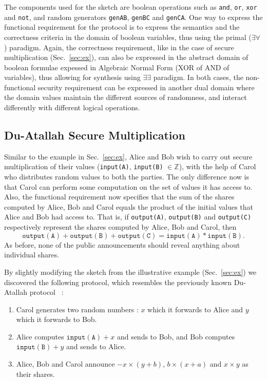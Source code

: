 \documentclass[preprint]{sig-alternate-05-2015}
\begin{document}
The components used for the sketch are boolean operations such as \texttt{and},
\texttt{or}, \texttt{xor} and \texttt{not}, and random generators \texttt{genAB},
\texttt{genBC} and \texttt{genCA}.
One way to express the functional requirement for the protocol is to 
express the semantics and the correctness criteria in the domain of boolean variables,
thus using the primal ($\exists \forall$) paradigm.
Again, the correctness requirement, like in the case of secure 
multiplication (Sec.~\ref{sec:ex}), can also be expressed in the
abstract domain of boolean formulae expessed in Algebraic Normal Form 
(XOR of AND of variables), thus allowing for synthesis using $\exists \exists$
paradigm.
In both cases, the non-functional security requirement
can be expressed in another dual domain where the domain values
maintain the different sources of randomness, 
and interact differently with different logical operations.

\subsection{Du-Atallah Secure Multiplication}

Similar to the example in Sec.~\ref{sec:ex}, 
Alice and Bob wish to carry out secure multiplication of 
their values (\texttt{input(A)}, \texttt{input(B)} $\in \mathbb{Z}$),
with the help of Carol who distributes random values to both the parties.
The only difference now is that Carol can perform some computation
on the set of values it has access to. 
Also, the functional requirement now specifies
that the sum of the shares computed by Alice, Bob 
and Carol equals the product of the initial values 
that Alice and Bob had access to.
That is, if \texttt{output(A)}, \texttt{output(B)} and \texttt{output(C)}
respectively represent the shares computed by Alice, Bob and Carol, then
$$
\mathtt{output(A)} + \mathtt{output(B)} + \mathtt{output(C)} = \mathtt{input(A)}*\mathtt{input(B)}.
$$
As before, none of the public announcements should reveal anything
about individual shares.

By slightly modifying the sketch from the illustrative example 
(Sec.~\ref{sec:ex}) we discovered the following 
protocol, which resembles the previously known Du-Atallah protocol~\cite{DA01} :

\begin{enumerate}
    \item Carol generates two random numbers : $x$ which it forwards to Alice
        and $y$ which it forwards to Bob.
    \item Alice computes $\mathtt{input(A)} + x$ and sends to Bob,
        and Bob computes $\mathtt{input(B)} + y$ and sends to Alice.
    \item Alice, Bob and Carol announce $-x\times(y+b)$, $b\times(x+a)$ and 
        $x\times y$ as their shares.
\end{enumerate}
\end{document}
